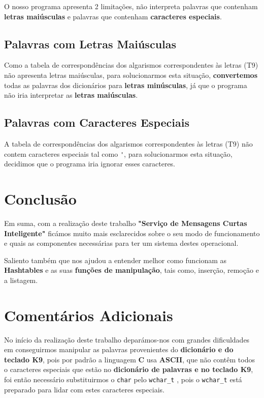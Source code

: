 \documentclass[11pt]{article}
\begin{document}
O nosso programa apresenta 2 limitações, não interpreta palavras que contenham \textbf{letras maiúsculas} e palavras que contenham \textbf{caracteres especiais}.

\subsection{Palavras com Letras Maiúsculas}

Como a tabela de correspondências dos algarismos correspondentes às letras (T9) não apresenta letras maiúsculas, para solucionarmos esta situação, \textbf{convertemos} todas as palavras dos dicionários para \textbf{letras minúsculas}, já que o programa não iria interpretar as \textbf{letras maiúsculas}.

\subsection{Palavras com Caracteres Especiais}

A tabela de correspondências dos algarismos correspondentes às letras (T9) não contem caracteres especiais tal como \verb|'|, para solucionarmos esta situação, decidimos que o programa iria ignorar esses caracteres.

\section{Conclusão}

\hspace{0,5cm}Em suma, com a realização deste trabalho \textbf{"Serviço de Mensagens Curtas Inteligente"} ficámos muito mais esclarecidos sobre o seu modo de funcionamento e quais as componentes necessárias para ter um sistema destes operacional.

Saliento também que nos ajudou a entender melhor como funcionam as \textbf{Hashtables} e as suas \textbf{funções de manipulação}, tais como, inserção, remoção e a listagem.
\section{Comentários Adicionais}

\hspace{0,5cm}No início da realização deste trabalho deparámos-nos com grandes dificuldades em conseguirmos manipular as palavras provenientes do \textbf{dicionário e do teclado K9}, pois por padrão a linguagem \textbf{C} usa \textbf{ASCII}, que não contêm todos o caracteres especiais que estão no \textbf{dicionário de palavras e no teclado K9}, foi então necessário substituirmos o \verb|char| pelo \verb|wchar_t| , pois o \verb|wchar_t| está preparado para lidar com estes caracteres especiais.
\end{document}
